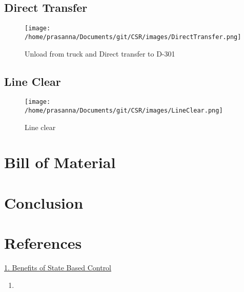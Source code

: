 \documentclass[a4paper,oneside]{article}
\begin{document}
\subsection{Direct Transfer}
\label{sec:orgd9a3d52}
\begin{figure}[htbp]
\centering
\texttt{[image: /home/prasanna/Documents/git/CSR/images/DirectTransfer.png]}
\caption{Unload from truck and Direct transfer to D-301}
\end{figure}
\subsection{Line Clear}
\label{sec:orgddb0af6}
\begin{figure}[htbp]
\centering
\texttt{[image: /home/prasanna/Documents/git/CSR/images/LineClear.png]}
\caption{Line clear}
\end{figure}
\section{Bill of Material}
\label{sec:org22ee9cf}
\section{Conclusion}
\label{sec:org3177b0c}
\section{References}
\label{sec:org1f2eceb}
\href{https://www.controlglobal.com/assets/knowledge\_centers/abb/assets/Benefits-of-state-based-control-white-paper.pdf}{1. Benefits of State Based Control}
\begin{enumerate}
\item 
\end{enumerate}
\end{document}

